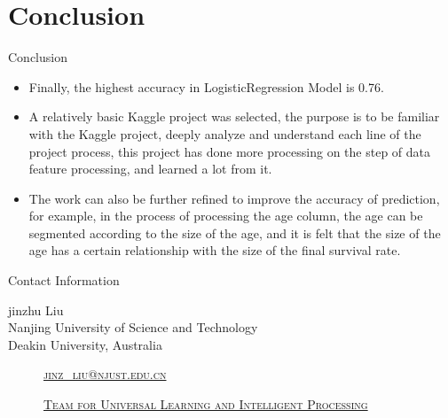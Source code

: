 \documentclass[
size=14pt,
paper=smartboard,  %
mode=present, 		%
display=slides, 	%
style=tuliplab,  	%
pauseslide,
fleqn,leqno]{powerdot}
\begin{document}
	
	\section{Conclusion}
	
	\begin{slide}{Conclusion}
		\begin{itemize}
			\item
			\smallskip
			Finally, the highest accuracy in LogisticRegression Model is 0.76.
			
			\item
			\smallskip
			A relatively basic Kaggle project was selected, the purpose is to be familiar with the Kaggle project, deeply analyze and understand each line of the project process, this project has done more processing on the step of data feature processing, and learned a lot from it.
			
			\item
			\smallskip
			The work can also be further refined to improve the accuracy of prediction, for example, in the process of processing the age column, the age can be segmented according to the size of the age, and it is felt that the size of the age has a certain relationship with the size of the final survival rate.
			
		\end{itemize}
	\end{slide}
	
	
	\begin{wideslide}[toc=,bm=]{Contact Information}
		\centering
		\twocolumn[
		lcolwidth=0.35\linewidth,
		rcolwidth=0.65\linewidth
		]
		{
		}
		{
			jinzhu Liu\\
			Nanjing University of Science and Technology\\
			Deakin University, Australia
			\begin{description}
				\item[\textcolor{orange}{\faEnvelope}] \href{mailto:jinz_liu@njust.edu.cn}
				{\textsc{\footnotesize{jinz_liu@njust.edu.cn}}}
				
				\item[\textcolor{orange}{\faHome}] \href{http://www.tulip.org.au}
				{\textsc{\footnotesize{Team for Universal Learning and Intelligent Processing}}}
			\end{description}
		}
	\end{wideslide}
	
\end{document}
